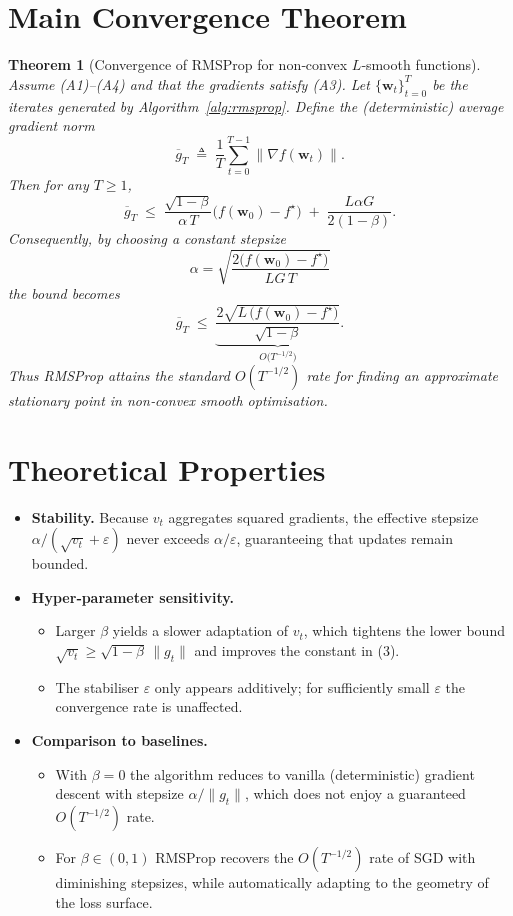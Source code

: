 \documentclass{article}
\newtheorem{theorem}{Theorem}
\begin{document}
\section*{Main Convergence Theorem}
\begin{theorem}[Convergence of RMSProp for non‑convex $L$‑smooth functions]\label{thm:main}
Assume (A1)–(A4) and that the gradients satisfy (A3).  
Let $\{\mathbf w_{t}\}_{t=0}^{T}$ be the iterates generated by Algorithm~\ref{alg:rmsprop}.  
Define the (deterministic) average gradient norm
\[
\overline{g}_{T}\;\triangleq\;
\frac{1}{T}\sum_{t=0}^{T-1}\|\nabla f(\mathbf w_{t})\|.
\]
Then for any $T\ge1$,
\[
\boxed{
\overline{g}_{T}
\;\le\;
\frac{\sqrt{1-\beta}}{\alpha\,T}\bigl(f(\mathbf w_{0})-f^{\star}\bigr)
\;+\;
\frac{L\alpha G}{2(1-\beta)} .
}
\tag{3}
\]
Consequently, by choosing a constant stepsize
\[
\alpha = \sqrt{\frac{2\bigl(f(\mathbf w_{0})-f^{\star}\bigr)}{L G\,T}}
\]
the bound becomes
\[
\overline{g}_{T}\;\le\;
\underbrace{\frac{2\sqrt{L\,\bigl(f(\mathbf w_{0})-f^{\star}\bigr)} }{\sqrt{1-\beta}}}_{\displaystyle O\!\bigl(T^{-1/2}\bigr)} .
\tag{4}
\]
Thus RMSProp attains the standard $O(T^{-1/2})$ rate for finding an \emph{approximate stationary point}
in non‑convex smooth optimisation.
\end{theorem}

\section*{Theoretical Properties}
\begin{itemize}
\item \textbf{Stability.}  Because $v_{t}$ aggregates squared gradients, the effective stepsize
$\alpha/(\sqrt{v_{t}}+\varepsilon)$ never exceeds $\alpha/ \varepsilon$, guaranteeing that updates remain bounded.
\item \textbf{Hyper‑parameter sensitivity.}
    \begin{itemize}
        \item Larger $\beta$ yields a slower adaptation of $v_{t}$, which tightens the lower bound
              $\sqrt{v_{t}}\ge\sqrt{1-\beta}\,\|g_{t}\|$ and improves the constant in (3).
        \item The stabiliser $\varepsilon$ only appears additively; for sufficiently small $\varepsilon$
              the convergence rate is unaffected.
    \end{itemize}
\item \textbf{Comparison to baselines.}
    \begin{itemize}
        \item With $\beta=0$ the algorithm reduces to vanilla (deterministic) gradient descent with stepsize $\alpha/\|g_{t}\|$, which does not enjoy a guaranteed $O(T^{-1/2})$ rate.
        \item For $\beta\in(0,1)$ RMSProp recovers the $O(T^{-1/2})$ rate of SGD with diminishing stepsizes, while automatically adapting to the geometry of the loss surface.
    \end{itemize}
\end{itemize}
\end{document}
